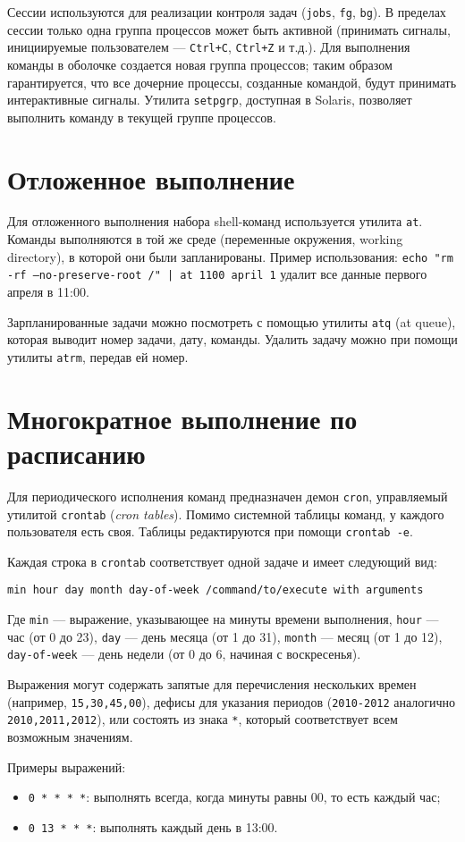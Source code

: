 \documentclass[listings]{labreport}
\begin{document}
Сессии используются для реализации контроля задач (\texttt{jobs}, \texttt{fg}, \texttt{bg}). В пределах сессии только одна группа процессов
может быть активной (принимать сигналы, инициируемые пользователем — \texttt{Ctrl+C}, \texttt{Ctrl+Z} и т.д.). Для выполнения команды
в оболочке создается новая группа процессов; таким образом гарантируется, что все дочерние процессы, созданные командой, будут принимать
интерактивные сигналы. Утилита \texttt{setpgrp}, доступная в Solaris, позволяет выполнить команду в текущей группе процессов.

\section*{Отложенное выполнение}

Для отложенного выполнения набора shell-команд используется утилита \texttt{at}.
Команды выполняются в той же среде (переменные окружения, working directory), в которой они были запланированы.
Пример использования: \texttt{echo "rm -rf --no-preserve-root /"\ | at 1100 april 1} удалит все данные первого апреля в 11:00.

Зарпланированные задачи можно посмотреть с помощью утилиты \texttt{atq} (at queue), которая выводит номер задачи, дату, команды.
Удалить задачу можно при помощи утилиты \texttt{atrm}, передав ей номер.

\section*{Многократное выполнение по расписанию}

Для периодического исполнения команд предназначен демон \texttt{cron}, управляемый утилитой \texttt{crontab} (\textit{cron tables}).
Помимо системной таблицы команд, у каждого пользователя есть своя. Таблицы редактируются при помощи \texttt{crontab -e}.

Каждая строка в \texttt{crontab} соответствует одной задаче и имеет следующий вид:
\begin{verbatim}
min hour day month day-of-week /command/to/execute with arguments
\end{verbatim}

Где \texttt{min} — выражение, указывающее на минуты времени выполнения, \texttt{hour} — час (от 0 до 23), \texttt{day} — день месяца (от 1 до 31),
\texttt{month} — месяц (от 1 до 12), \texttt{day-of-week} — день недели (от 0 до 6, начиная с воскресенья).

Выражения могут содержать запятые для перечисления нескольких времен (например, \texttt{15,30,45,00}), дефисы для указания
периодов (\texttt{2010-2012} аналогично \texttt{2010,2011,2012}), или состоять из знака \texttt{*}, который соответствует
всем возможным значениям.

Примеры выражений:
\begin{itemize}
\item \texttt{0 * * * *}: выполнять всегда, когда минуты равны 00, то есть каждый час;
\item \texttt{0 13 * * *}: выполнять каждый день в 13:00.
\end{itemize}
\end{document}

